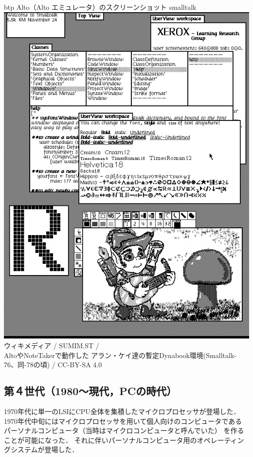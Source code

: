 \begin{itemize}
\begin{myfig}{btp}
{Alto（Alto エミュレータ）のスクリーンショット}
{smalltalk}
\includegraphics[scale=0.5]{Photo/Smalltalk-76.png}\\
{\small
ウィキメディア /
SUMIM.ST /\\
AltoやNoteTakerで動作した
アラン・ケイ達の暫定Dynabook環境(Smalltalk-76、同-78の頃) /
CC-BY-SA 4.0
}
\end{myfig}

\end{itemize}

\subsection{第４世代（1980〜現代，PCの時代）}

1970年代に単一のLSIにCPU全体を集積したマイクロプロセッサが登場した．
1970年代中旬にはマイクロプロセッサを用いて個人向けのコンピュータである
パーソナルコンピュータ（当時はマイクロコンピュータと呼んでいた）
を作ることが可能になった．
それに伴いパーソナルコンピュータ用のオペレーティングシステムが登場した．

